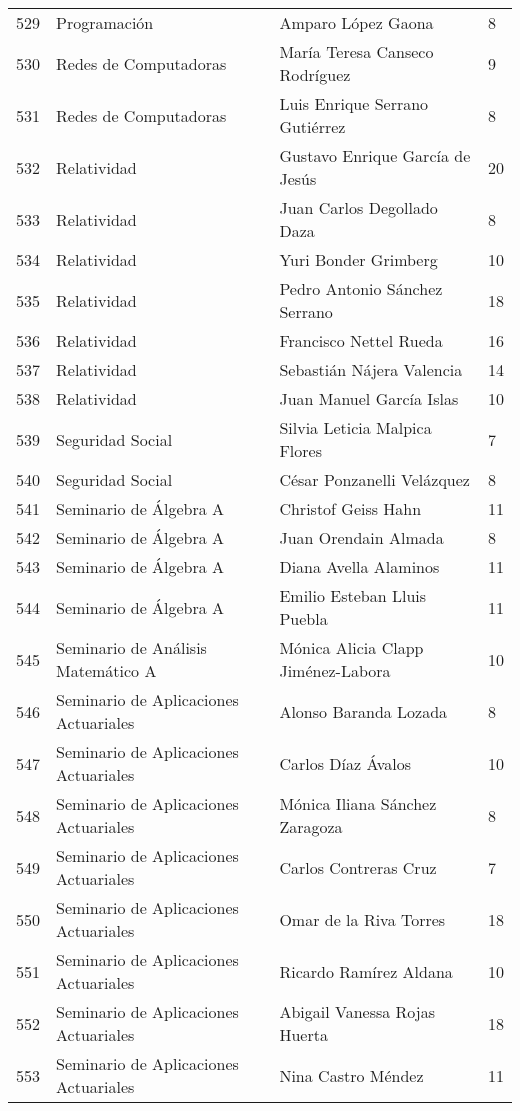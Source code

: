 \begin{table}[ht]
\begin{tabular}{rlll}
  529 & Programación & Amparo López Gaona & 8 \\ 
  530 & Redes de Computadoras & María Teresa Canseco Rodríguez & 9 \\ 
  531 & Redes de Computadoras & Luis Enrique Serrano Gutiérrez & 8 \\ 
  532 & Relatividad & Gustavo Enrique García de Jesús & 20 \\ 
  533 & Relatividad & Juan Carlos Degollado Daza & 8 \\ 
  534 & Relatividad & Yuri Bonder Grimberg & 10 \\ 
  535 & Relatividad & Pedro Antonio Sánchez Serrano & 18 \\ 
  536 & Relatividad & Francisco Nettel Rueda & 16 \\ 
  537 & Relatividad & Sebastián Nájera Valencia & 14 \\ 
  538 & Relatividad & Juan Manuel García Islas & 10 \\ 
  539 & Seguridad Social & Silvia Leticia Malpica Flores & 7 \\ 
  540 & Seguridad Social & César Ponzanelli Velázquez & 8 \\ 
  541 & Seminario de Álgebra A & Christof Geiss Hahn & 11 \\ 
  542 & Seminario de Álgebra A & Juan Orendain Almada & 8 \\ 
  543 & Seminario de Álgebra A & Diana Avella Alaminos & 11 \\ 
  544 & Seminario de Álgebra A & Emilio Esteban Lluis Puebla & 11 \\ 
  545 & Seminario de Análisis Matemático A & Mónica Alicia Clapp Jiménez-Labora & 10 \\ 
  546 & Seminario de Aplicaciones Actuariales & Alonso Baranda Lozada & 8 \\ 
  547 & Seminario de Aplicaciones Actuariales & Carlos Díaz Ávalos & 10 \\ 
  548 & Seminario de Aplicaciones Actuariales & Mónica Iliana Sánchez Zaragoza & 8 \\ 
  549 & Seminario de Aplicaciones Actuariales & Carlos Contreras Cruz & 7 \\ 
  550 & Seminario de Aplicaciones Actuariales & Omar de la Riva Torres & 18 \\ 
  551 & Seminario de Aplicaciones Actuariales & Ricardo Ramírez Aldana & 10 \\ 
  552 & Seminario de Aplicaciones Actuariales & Abigail Vanessa Rojas Huerta & 18 \\ 
  553 & Seminario de Aplicaciones Actuariales & Nina Castro Méndez & 11 \\ 

\end{tabular}
\end{table}
